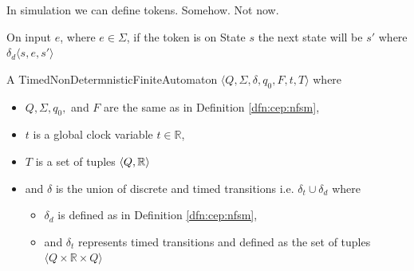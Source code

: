 			In simulation we can define tokens. Somehow. Not now. %
			
			
			On input $e$, where $e \in \Sigma$, if the token is on State $s$ the next state will be $s'$ where 
			$\delta_d \langle s,e,s' \rangle$ 
			
			
			
			\begin{dfn}
				A TimedNonDetermnisticFiniteAutomaton $\langle Q,\Sigma,\delta,q_0, F, t, T \rangle$ where
				\begin{itemize}
					\item $Q, \Sigma, q_0,$ and $F$ are the same as in Definition \ref{dfn:cep:nfsm},
					\item $t$ is a global clock variable $t \in \mathbb{R}$,
					\item $T$ is a set of tuples $\langle Q, \mathbb{R} \rangle$
					\item and $\delta$ is the union of discrete and timed transitions i.e. $\delta_t \cup \delta_d$ where
					\begin{itemize}
						\item $\delta_d$ is defined as in Definition \ref{dfn:cep:nfsm},
						\item and $\delta_t$ represents timed transitions and defined as the set of tuples $\langle Q \times \mathbb{R} \times Q \rangle$ 
					\end{itemize}
				\end{itemize}
				
				
			\end{dfn}

